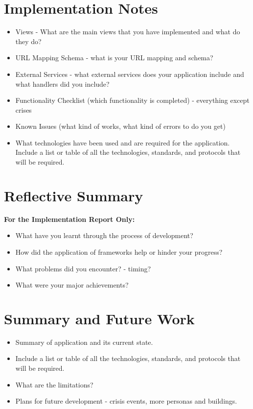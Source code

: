 \documentclass{sig-alt-release2}
\begin{document}
\section{Implementation Notes}


\begin{itemize}

\item Views - What are the main views that you have implemented and what do they do?

\item URL Mapping Schema - what is your URL mapping and schema?

\item External Services  - what external services does your application include and what handlers did you include?

\item	Functionality Checklist (which functionality is completed) - everything except crises 

\item	Known Issues (what kind of works, what kind of errors to do you get)

\item What technologies have been used and are required for the application. Include a list or table of all the technologies, standards, and protocols that will be required.
\end{itemize}

\section{Reflective Summary}
{\bf For the Implementation Report Only:}
\begin{itemize}

\item	What have you learnt through the process of development? 

\item	How did the application of frameworks help or hinder your progress? 

\item	What problems did you encounter? - timing?

\item	What were your major achievements?
\end{itemize}

\section{Summary and Future Work}
\begin{itemize}

\item	Summary of application and its current state.

\item	Include a list or table of all the technologies, standards, and protocols that will be required.

\item	What are the limitations?

\item Plans for future development - crisis events, more personas and buildings.

\end{itemize}
\end{document}
